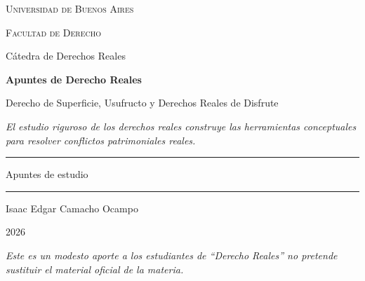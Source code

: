 \documentclass[12pt,oneside]{book}
\begin{document}

\begin{titlepage}

\thispagestyle{empty}

\begin{center}

\vspace*{1cm}

{\large \textsc{Universidad de Buenos Aires}}

\vspace{0.2cm}

{\large \textsc{Facultad de Derecho}}

\vspace{0.2cm}

{\large Cátedra de Derechos Reales}

\vspace{3cm}

{\Huge \textbf{Apuntes de Derecho Reales}}

\vspace{0.8cm}

{\LARGE Derecho de Superficie, Usufructo y Derechos Reales de Disfrute}

\vspace{0.8cm}

\textit{El estudio riguroso de los derechos reales construye las herramientas conceptuales para resolver conflictos patrimoniales reales.}

\vspace{1.2cm}

\rule{0.70\textwidth}{0.5pt}

\vspace{0.5cm}

{\large Apuntes de estudio}

\vspace{0.5cm}

\rule{0.70\textwidth}{0.5pt}

\vfill

{\large Isaac Edgar Camacho Ocampo}

\vspace{0.3cm}

{\large 2026}

\end{center}

\vfill

\begin{flushleft}
\textit{Este es un modesto aporte a los estudiantes de ``Derecho Reales'' no pretende sustituir el material oficial de la materia.}
\end{flushleft}

\end{titlepage}
\end{document}
